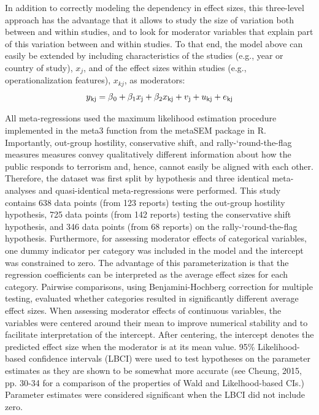In addition to correctly modeling the dependency in effect sizes, this three-level approach has the advantage that it allows to study the size of variation both between and within studies, and to look for moderator variables that explain part of this variation between and within studies. To that end, the model above can easily be extended by including characteristics of the studies (e.g., year or country of study), $x_j$, and of the effect sizes within studies (e.g., operationalization features), $x_{kj}$, as moderators:
\begin{equation}
y\textsubscript{kj} = \beta\textsubscript{0} +  \beta_1x\textsubscript{j} + \beta_2x\textsubscript{kj} + v\textsubscript{j} + u\textsubscript{kj} + e\textsubscript{kj}
\end{equation}


All meta-regressions used the maximum likelihood estimation procedure implemented in the {\ttfamily meta3} function from the {\ttfamily metaSEM} package in R. Importantly, out-group hostility, conservative shift, and rally-‘round-the-flag measures measures convey qualitatively different information about how the public responds to terrorism and, hence, cannot easily be aligned with each other. Therefore, the dataset was first split by hypothesis and three identical meta-analyses and quasi-identical meta-regressions were performed. This study contains 638 data points (from 123 reports) testing the out-group hostility hypothesis, 725 data points (from 142 reports) testing the conservative shift hypothesis, and 346 data points (from 68 reports) on the rally-‘round-the-flag hypothesis. Furthermore, for assessing moderator effects of categorical variables, one dummy indicator per category was included in the model and the intercept was constrained to zero. The advantage of this parameterization is that the regression coefficients can be interpreted as the average effect sizes for each category. Pairwise comparisons, using Benjamini-Hochberg correction for multiple testing, evaluated whether categories resulted in significantly different average effect sizes. When assessing moderator effects of continuous variables, the variables were centered around their mean to improve numerical stability and to facilitate interpretation of the intercept. After centering, the intercept denotes the predicted effect size when the moderator is at its mean value. 95\% Likelihood-based confidence intervals (LBCI) were used to test hypotheses on the parameter estimates as they are shown to be somewhat more accurate (see Cheung, 2015, pp. 30-34 for a comparison of the properties of Wald and Likelhood-based CIs.) Parameter estimates were considered significant when the LBCI did not include zero.



